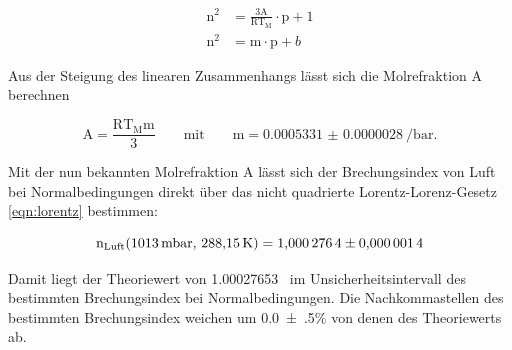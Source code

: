         \FloatBarrier

        \begin{align}
            \text{n}^2 &= \frac{3\text{A}}{\text{RT}_{\text{M}}} \cdot \text{p} + 1 \\
            \text{n}^2 &= \text{m} \cdot \text{p} + b
        \end{align}

        Aus der Steigung des linearen Zusammenhangs lässt sich die Molrefraktion A berechnen

        \begin{equation}
            \text{A} = \frac{\text{RT}_{\text{M}}\text{m}}{3} \qquad \text{mit} \qquad \text{m}=\SI{0.0005331(28)}{\per\bar}.
        \end{equation}

        Mit der nun bekannten Molrefraktion A lässt sich der Brechungsindex von Luft bei Normalbedingungen direkt über das nicht quadrierte Lorentz-Lorenz-Gesetz \eqref{eqn:lorentz} bestimmen:

        \begin{equation}
            \text{n}_{\text{Luft}}(\SI{1013}{\milli\bar}, \, \SI{288.15}{\kelvin}) = \num{1.0002764 +- 0.0000014}
        \end{equation}

        Damit liegt der Theoriewert von \num{1.00027653}~\cite{ciddor_refractive_1996} im Unsicherheitsintervall des bestimmten Brechungsindex bei Normalbedingungen. Die Nachkommastellen des bestimmten 
        Brechungsindex weichen um \num{0.0(5)}\% von denen des Theoriewerts ab.
        
